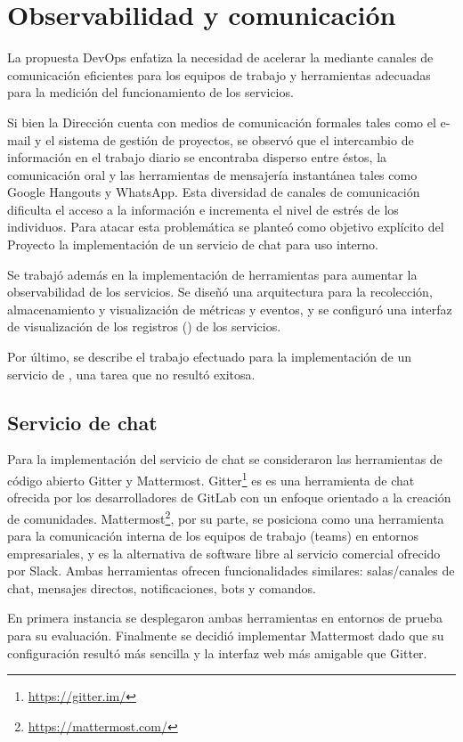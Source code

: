 %
%
%
\chapter{Observabilidad y comunicación}
%
La propuesta DevOps enfatiza la necesidad de acelerar la
 mediante canales de comunicación eficientes
para los equipos de trabajo y herramientas adecuadas para la medición
del funcionamiento de los servicios.

Si bien la Dirección cuenta con medios de comunicación formales tales
como el e-mail y el sistema de gestión de proyectos, se observó que el
intercambio de información en el trabajo diario se encontraba disperso
entre éstos, la comunicación oral y las herramientas de mensajería
instantánea tales como Google Hangouts y WhatsApp. Esta diversidad de
canales de comunicación dificulta el acceso a la información e
incrementa el nivel de estrés de los individuos. Para atacar esta
problemática se planteó como objetivo explícito del Proyecto la
implementación de un servicio de chat para uso interno.

Se trabajó además en la implementación de herramientas para aumentar
la observabilidad de los servicios. Se diseñó una arquitectura para la
recolección, almacenamiento y visualización de métricas y eventos, y
se configuró una interfaz de visualización de los registros
() de los servicios.

Por último, se describe el trabajo efectuado para la implementación de
un servicio de , una tarea que no
resultó exitosa.
%
%
\section{Servicio de chat}
%
Para la implementación del servicio de chat se consideraron las
herramientas de código abierto Gitter y Mattermost. Gitter\footnote{
  \url{https://gitter.im/}} es es una herramienta de chat ofrecida por
los desarrolladores de GitLab con un enfoque orientado a la creación
de comunidades. Mattermost\footnote{ \url{https://mattermost.com/} },
por su parte, se posiciona como una herramienta para la comunicación
interna de los equipos de trabajo (teams) en entornos empresariales, y
es la alternativa de software libre al servicio comercial ofrecido por
Slack. Ambas herramientas ofrecen funcionalidades similares:
salas/canales de chat, mensajes directos, notificaciones, bots y
comandos.

En primera instancia se desplegaron ambas herramientas en entornos de
prueba para su evaluación. Finalmente se decidió implementar
Mattermost dado que su configuración resultó más sencilla y la
interfaz web más amigable que Gitter.

